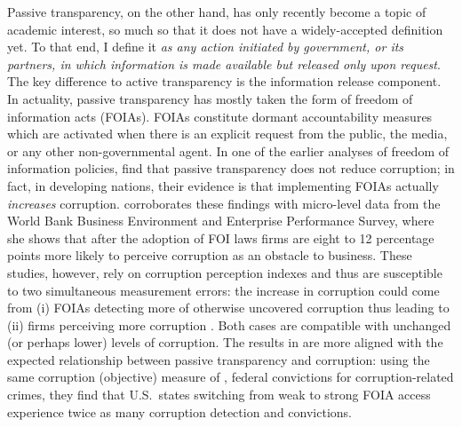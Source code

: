 \documentclass[11pt]{article}
\begin{document}
Passive transparency, on the other hand, has only recently become a topic of academic interest, so much so that it does not have a widely-accepted definition yet. To that end, I define it \emph{as any action initiated by government, or its partners, in which information is made available but released only upon request}. The key difference to active transparency is the information release component. In actuality, passive transparency has mostly taken the form of freedom of information acts (FOIAs). FOIAs constitute dormant accountability measures which are activated when there is an explicit request from the public, the media, or any other non-governmental agent. In one of the earlier analyses of freedom of information policies, \citet{EscalerasFreedominformationacts2010} find that passive transparency does not reduce corruption; in fact, in developing nations, their evidence is that implementing FOIAs actually \emph{increases} corruption. \citet{CostaFreedomInformationLaws2013} corroborates these findings with micro-level data from the World Bank Business Environment and Enterprise Performance Survey, where she shows that after the adoption of FOI laws firms are eight to 12 percentage points more likely to perceive corruption as an obstacle to business. These studies, however, rely on corruption perception indexes and thus are susceptible to two simultaneous measurement errors: the increase in corruption could come from (i) FOIAs detecting more of otherwise uncovered corruption \citep[an issue in ][]{EscalerasFreedominformationacts2010} thus leading to (ii) firms perceiving more corruption \citep[an issue in][]{CostaFreedomInformationLaws2013}. Both cases are compatible with unchanged (or perhaps lower) levels of corruption. The results in \citet{CordisSunshineDisinfectantEffect2014} are more aligned with the expected relationship between passive transparency and corruption: using the same corruption (objective) measure of \citet{CampanteIsolatedCapitalCities2014}, federal convictions for corruption-related crimes, they find that U.S.~states switching from weak to strong FOIA access experience twice as many corruption detection and convictions.
\end{document}
